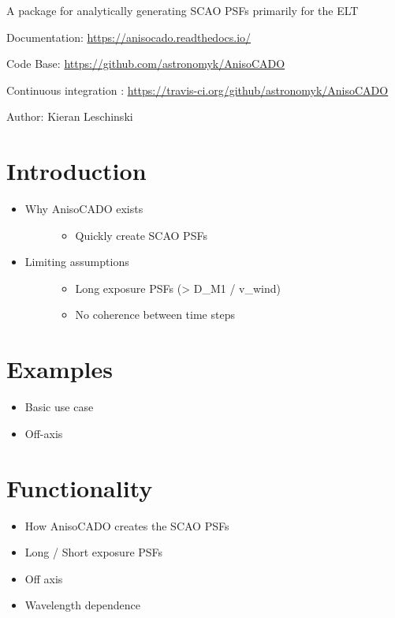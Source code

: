 
A package for analytically generating SCAO PSFs primarily for the ELT

Documentation: \url{https://anisocado.readthedocs.io/}

Code Base: \url{https://github.com/astronomyk/AnisoCADO}

Continuous integration : \url{https://travis-ci.org/github/astronomyk/AnisoCADO}

Author: Kieran Leschinski


\section{Introduction%
  \label{introduction}%
}

\begin{itemize}
\item 
\begin{description}
\item[{Why AnisoCADO exists}] \leavevmode 
\begin{itemize}
\item Quickly create SCAO PSFs
\end{itemize}

\end{description}

\item 
\begin{description}
\item[{Limiting assumptions}] \leavevmode 
\begin{itemize}
\item Long exposure PSFs (> D\_M1 / v\_wind)

\item No coherence between time steps
\end{itemize}

\end{description}
\end{itemize}


\section{Examples%
  \label{examples}%
}

\begin{itemize}
\item Basic use case

\item Off-axis
\end{itemize}


\section{Functionality%
  \label{functionality}%
}

\begin{itemize}
\item How AnisoCADO creates the SCAO PSFs

\item Long / Short exposure PSFs

\item Off axis

\item Wavelength dependence
\end{itemize}

